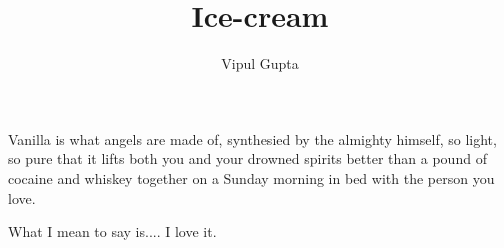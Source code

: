 \documentclass{article}
\begin{document}
\title{Ice-cream}
Vanilla is what angels are made of, synthesied by the almighty himself, so light, so pure that it lifts both you and your drowned spirits better than a pound of cocaine and whiskey together on a Sunday morning in bed with the person you love.\

What I mean to say is.... I love it. 
\author{Vipul Gupta}
\end{document}
